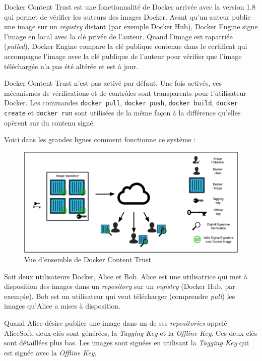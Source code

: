 \documentclass[11pt,a4paper,oneside]{report}
\newcommand{\code}[1]{\texttt{#1}}
\begin{document}
Docker Content Trust\cite{blog_docker_content_trust}\cite{mouat_2005} est une fonctionnalité de Docker arrivée avec la version 1.8 qui permet de vérifier les auteurs des images Docker. Avant qu'un auteur publie une image sur un \textit{registry} distant (par exemple Docker Hub), Docker Engine signe l'image en local avec la clé privée de l'auteur. Quand l'image est rapatriée (\textit{pulled}), Docker Engine compare la clé publique contenue dans le certificat qui accompagne l'image avec la clé publique de l'auteur pour vérifier que l'image téléchargée n'a pas été altérée et est à jour.

Docker Content Trust n'est pas activé par défaut. Une fois activés, ces mécanismes de vérifications et de contrôles sont transparents pour l'utilisateur Docker. Les commandes \code{docker pull}, \code{docker push}, \code{docker build}, \code{docker create} et \code{docker run} sont utilisées de la même façon à la différence qu'elles opèrent sur du contenu signé.

Voici dans les grandes lignes comment fonctionne ce système :

\begin{figure}[H]
\centering
\includegraphics[scale=1]{img/dct1.png}
\caption{Vue d'ensemble de Docker Content Trust}
\end{figure}

Soit deux utilisateurs Docker, Alice et Bob. Alice est une utilisatrice qui met à disposition des images dans un \textit{repository} sur un \textit{registry} (Docker Hub, par exemple). Bob est un utilisateur qui veut télécharger (comprendre \textit{pull}) les images qu'Alice a mises à disposition.

Quand Alice désire publier une image dans un de ses \textit{repositories} appelé AliceSoft, deux clés sont générées, la \textit{Tagging Key} et la \textit{Offline Key}. Ces deux clés sont détaillées plus bas. Les images sont signées en utilisant la \textit{Tagging Key} qui est signée avec la \textit{Offline Key}.
\end{document}
